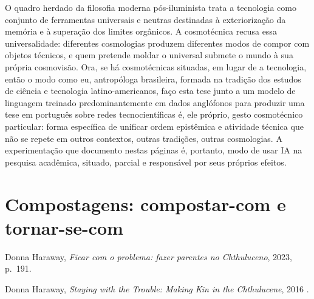 O quadro herdado da filosofia moderna pós-iluminista trata a tecnologia como conjunto de ferramentas universais e neutras destinadas à exteriorização da memória e à superação dos limites orgânicos. A cosmotécnica recusa essa universalidade: diferentes cosmologias produzem diferentes modos de compor com objetos técnicos, e quem pretende moldar o universal submete o mundo à sua própria cosmovisão. Ora, se há cosmotécnicas situadas, em lugar de a tecnologia, então o modo como eu, antropóloga brasileira, formada na tradição dos estudos de ciência e tecnologia latino-americanos, faço esta tese junto a um modelo de linguagem treinado predominantemente em dados anglófonos para produzir uma tese em português sobre redes tecnocientíficas é, ele próprio, gesto cosmotécnico particular: forma específica de unificar ordem epistêmica e atividade técnica que não se repete em outros contextos, outras tradições, outras cosmologias. A experimentação que documento nestas páginas é, portanto, modo de usar IA na pesquisa acadêmica, situado, parcial e responsável por seus próprios efeitos.

\section{Compostagens: compostar-com e tornar-se-com}
\label{sec:compostagens}

%
{Donna Haraway, \textit{Ficar com o problema: fazer parentes no Chthuluceno}, 2023, p.~191.}

%
{Donna Haraway, \textit{Staying with the Trouble: Making Kin in the Chthulucene}, 2016 \parencite[p.~35]{Haraway2023Ficar}.}

